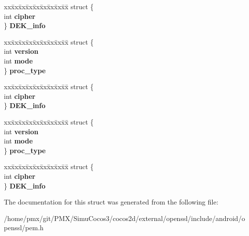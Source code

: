 \begin{DoxyCompactItemize}
\begin{tabbing}
\end{tabbing}\item 
\mbox{\label{structpem__ctx__st_a9fd08bcff4fef8e5c466fef027623898}} 
\begin{tabbing}
xx\=xx\=xx\=xx\=xx\=xx\=xx\=xx\=xx\=\kill
struct \{\\
\>int {\bfseries cipher}\\
\} {\bfseries DEK\_info}\\

\end{tabbing}\item 
\mbox{\label{structpem__ctx__st_a84147bbfe8848ac2844461a9a248a2ff}} 
\begin{tabbing}
xx\=xx\=xx\=xx\=xx\=xx\=xx\=xx\=xx\=\kill
struct \{\\
\>int {\bfseries version}\\
\>int {\bfseries mode}\\
\} {\bfseries proc\_type}\\

\end{tabbing}\item 
\mbox{\label{structpem__ctx__st_a3e8b5e143abf1627dbe39bd1588e0142}} 
\begin{tabbing}
xx\=xx\=xx\=xx\=xx\=xx\=xx\=xx\=xx\=\kill
struct \{\\
\>int {\bfseries cipher}\\
\} {\bfseries DEK\_info}\\

\end{tabbing}\item 
\mbox{\label{structpem__ctx__st_a3855374a422f0453ec34f785418ebb46}} 
\begin{tabbing}
xx\=xx\=xx\=xx\=xx\=xx\=xx\=xx\=xx\=\kill
struct \{\\
\>int {\bfseries version}\\
\>int {\bfseries mode}\\
\} {\bfseries proc\_type}\\

\end{tabbing}\item 
\mbox{\label{structpem__ctx__st_ac7a3b3ee011a0bebce28a01df27150b2}} 
\begin{tabbing}
xx\=xx\=xx\=xx\=xx\=xx\=xx\=xx\=xx\=\kill
struct \{\\
\>int {\bfseries cipher}\\
\} {\bfseries DEK\_info}\\

\end{tabbing}\end{DoxyCompactItemize}


The documentation for this struct was generated from the following file\+:\begin{DoxyCompactItemize}
\item 
/home/pmx/git/\+P\+M\+X/\+Simu\+Cocos3/cocos2d/external/openssl/include/android/openssl/pem.\+h\end{DoxyCompactItemize}
